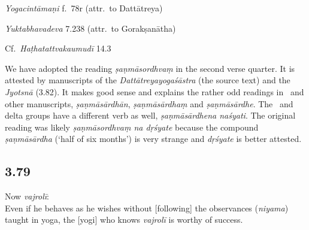 \begin{ekdosis}
\begin{testimonia}[hp03_078]
\emph{Yogacintāmaṇi} f.~78r (attr.~to Dattātreya)
\begin{versinnote}
\end{versinnote}

\emph{Yuktabhavadeva} 7.238 (attr.~to Gorakṣanātha)
\begin{versinnote}
\end{versinnote}

Cf.~\emph{Haṭhatattvakaumudī} 14.3
 \begin{versinnote}
\end{versinnote}
\end{testimonia}

\begin{philcomm}[hp03_078]
We have adopted the reading \emph{ṣaṇmāsordhvaṃ} in the second verse quarter. It is attested by manuscripts of the \emph{Dattātreyayogaśāstra} (the source text) and the \emph{Jyotsnā} (3.82). It makes good sense and explains the rather odd readings in \textalpha\ and other manuscripts, \emph{ṣaṇmāsārdhān}, \emph{ṣaṇmāsārdhaṃ} and \emph{ṣaṇmāsārdhe}. The \textgamma\ and delta groups have a different verb as well, \emph{ṣaṇmāsārdhena naśyati}. The original reading was likely \emph{ṣaṇmāsordhvaṃ na dṛśyate} because the compound \emph{ṣaṇmāsārdha} (`half of six months') is very strange and \emph{dṛśyate} is better attested.

\end{philcomm}


\subsection*{3.79}
\begin{translation}[hp03_079]
Now \emph{vajrolī}:\\
Even if he behaves as he wishes without [following] the observances (\emph{niyama}) taught in yoga, the [yogi] who knows \emph{vajrolī} is worthy of success.
\end{translation}


\end{ekdosis}
